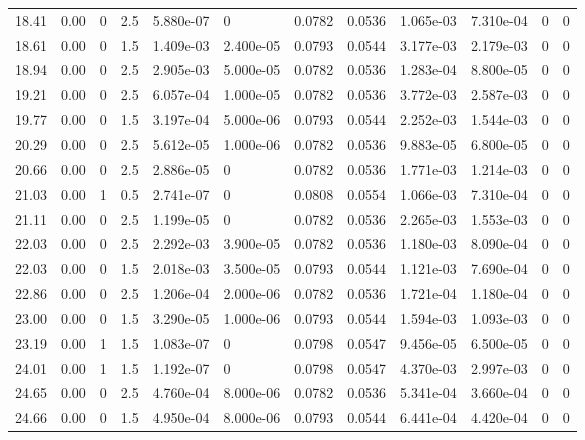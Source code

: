 \documentclass[preview]{standalone}
\begin{document}
{{{\begin{tabular}{L{1.2cm}C{1.2cm} C{0.3cm}C{0.5cm} C{1.4cm}C{1.4cm} C{1.4cm}C{1.4cm} C{1.6cm}C{1.6cm} C{1.6cm}C{1.6cm}}
  18.41  &  0.00  & 0     & 2.5 &  5.880e-07  & 0  &  0.0782&   0.0536& 1.065e-03 & 7.310e-04   &  0 & 0  \\ 
  18.61  &  0.00  & 0     & 1.5 &  1.409e-03  & 2.400e-05  &  0.0793&   0.0544& 3.177e-03 & 2.179e-03   &  0 & 0  \\ 
  18.94  &  0.00  & 0     & 2.5 &  2.905e-03  & 5.000e-05  &  0.0782&   0.0536& 1.283e-04 & 8.800e-05   &  0 & 0  \\ 
  19.21  &  0.00  & 0     & 2.5 &  6.057e-04  & 1.000e-05  &  0.0782&   0.0536& 3.772e-03 & 2.587e-03   &  0 & 0  \\ 
  19.77  &  0.00  & 0     & 1.5 &  3.197e-04  & 5.000e-06  &  0.0793&   0.0544& 2.252e-03 & 1.544e-03   &  0 & 0  \\ 
  20.29  &  0.00  & 0     & 2.5 &  5.612e-05  & 1.000e-06  &  0.0782&   0.0536& 9.883e-05 & 6.800e-05   &  0 & 0  \\ 
  20.66  &  0.00  & 0     & 2.5 &  2.886e-05  & 0  &  0.0782&   0.0536& 1.771e-03 & 1.214e-03   &  0 & 0  \\ 
  21.03  &  0.00  & 1     & 0.5 &  2.741e-07  & 0  &  0.0808&   0.0554& 1.066e-03 & 7.310e-04   &  0 & 0  \\ 
  21.11  &  0.00  & 0     & 2.5 &  1.199e-05  & 0  &  0.0782&   0.0536& 2.265e-03 & 1.553e-03   &  0 & 0  \\ 
  22.03  &  0.00  & 0     & 2.5 &  2.292e-03  & 3.900e-05  &  0.0782&   0.0536& 1.180e-03 & 8.090e-04   &  0 & 0  \\ 
  22.03  &  0.00  & 0     & 1.5 &  2.018e-03  & 3.500e-05  &  0.0793&   0.0544& 1.121e-03 & 7.690e-04   &  0 & 0  \\ 
  22.86  &  0.00  & 0     & 2.5 &  1.206e-04  & 2.000e-06  &  0.0782&   0.0536& 1.721e-04 & 1.180e-04   &  0 & 0  \\ 
  23.00  &  0.00  & 0     & 1.5 &  3.290e-05  & 1.000e-06  &  0.0793&   0.0544& 1.594e-03 & 1.093e-03   &  0 & 0  \\ 
  23.19  &  0.00  & 1     & 1.5 &  1.083e-07  & 0  &  0.0798&   0.0547& 9.456e-05 & 6.500e-05   &  0 & 0  \\ 
  24.01  &  0.00  & 1     & 1.5 &  1.192e-07  & 0  &  0.0798&   0.0547& 4.370e-03 & 2.997e-03   &  0 & 0  \\ 
  24.65  &  0.00  & 0     & 2.5 &  4.760e-04  & 8.000e-06  &  0.0782&   0.0536& 5.341e-04 & 3.660e-04   &  0 & 0  \\ 
  24.66  &  0.00  & 0     & 1.5 &  4.950e-04  & 8.000e-06  &  0.0793&   0.0544& 6.441e-04 & 4.420e-04   &  0 & 0  \\ 

\end{tabular}}}}
\end{document}
